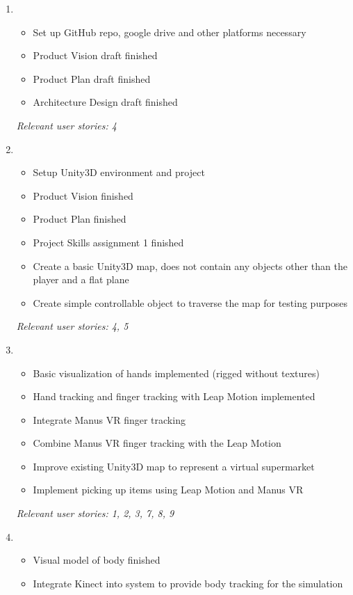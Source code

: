 \documentclass[11pt,a4paper]{report}
\begin{document}
\begin{enumerate}[label=\large{ \textbf{Sprint \arabic*}},leftmargin=3\parindent]
\item
\begin{itemize}
\item Set up GitHub repo, google drive and other platforms necessary
\item Product Vision draft finished
\item Product Plan draft finished
\item Architecture Design draft finished
\end{itemize}
\textit{Relevant user stories: 4}
\item 
\begin{itemize}
\item Setup Unity3D environment and project
\item Product Vision finished
\item Product Plan finished
\item Project Skills assignment 1 finished
\item Create a basic Unity3D map, does not contain any objects other than the player and a flat plane
\item Create simple controllable object to traverse the map for testing purposes
\end{itemize}
\textit{Relevant user stories: 4, 5}
\item 
\begin{itemize}
\item Basic visualization of hands implemented (rigged without textures)
\item Hand tracking and finger tracking with Leap Motion implemented
\item Integrate Manus VR finger tracking
\item Combine Manus VR finger tracking with the Leap Motion
\item Improve existing Unity3D map to represent a virtual supermarket
\item Implement picking up items using Leap Motion and Manus VR
\end{itemize}
\textit{Relevant user stories: 1, 2, 3, 7, 8, 9 }
\item 
\begin{itemize}
\item Visual model of body finished
\item Integrate Kinect into system to provide body tracking for the simulation

\end{itemize}
\end{enumerate}
\end{document}
